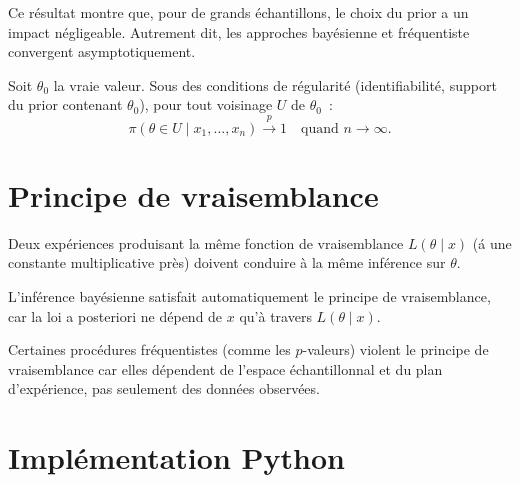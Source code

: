 \begin{remarque}
Ce r\'esultat montre que, pour de grands \'echantillons, le choix du
prior a un impact n\'egligeable. Autrement dit, les approches
bay\'esienne et fr\'equentiste convergent asymptotiquement.
\end{remarque}

\begin{theoreme}
Soit $\theta_0$ la vraie valeur. Sous des conditions de r\'egularit\'e
(identifiabilit\'e, support du prior contenant $\theta_0$),
pour tout voisinage $U$ de $\theta_0$~:
\[
  \pi(\theta \in U \mid x_1, \ldots, x_n) \xrightarrow{p} 1
  \quad \text{quand } n \to \infty.
\]
\end{theoreme}

\section{Principe de vraisemblance}

\begin{definition}
Deux exp\'eriences produisant la m\^eme fonction de vraisemblance
$L(\theta \mid x)$ (\'a une constante multiplicative pr\`es) doivent
conduire \`a la m\^eme inf\'erence sur $\theta$.
\end{definition}

\begin{proposition}
L'inf\'erence bay\'esienne satisfait automatiquement le principe de
vraisemblance, car la loi a posteriori ne d\'epend de $x$ qu'\`a
travers $L(\theta \mid x)$.
\end{proposition}

\begin{attention}[title=\textbf{Violation fr\'equentiste}]
Certaines proc\'edures fr\'equentistes (comme les $p$-valeurs) violent
le principe de vraisemblance car elles d\'ependent de l'espace
\'echantillonnal et du plan d'exp\'erience, pas seulement des donn\'ees
observ\'ees.
\end{attention}

\section{Impl\'ementation Python}

